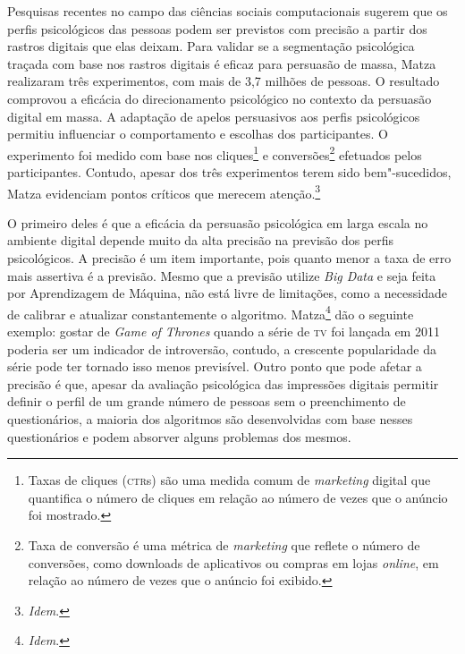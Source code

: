 Pesquisas recentes no campo das ciências sociais computacionais sugerem
que os perfis psicológicos das pessoas podem ser previstos com precisão
a partir dos rastros digitais que elas deixam. Para validar se a
segmentação psicológica traçada com base nos rastros digitais é eficaz
para persuasão de massa, Matza realizaram três
experimentos, com mais de 3,7 milhões de pessoas. O resultado comprovou
a eficácia do direcionamento psicológico no contexto da persuasão
digital em massa. A adaptação de apelos persuasivos aos perfis
psicológicos permitiu influenciar o comportamento e escolhas dos
participantes. O experimento foi medido com base nos cliques\footnote{Taxas
  de cliques (\textsc{ctr}s) são uma medida comum de \textit{marketing} digital que
  quantifica o número de cliques em relação ao número de vezes que o
  anúncio foi mostrado.} e conversões\footnote{Taxa de conversão é uma
  métrica de \textit{marketing} que reflete o número de conversões, como
  downloads de aplicativos ou compras em lojas \textit{online}, em relação ao
  número de vezes que o anúncio foi exibido.} efetuados pelos
participantes. Contudo, apesar dos três experimentos terem sido
bem"-sucedidos, Matza evidenciam pontos críticos que merecem
atenção.\footnote{\textit{Idem}.}

O primeiro deles é que a eficácia da persuasão psicológica em larga
escala no ambiente digital depende muito da alta precisão na previsão
dos perfis psicológicos. A precisão é um item importante, pois quanto
menor a taxa de erro mais assertiva é a previsão. Mesmo que a previsão
utilize \textit{Big Data} e seja feita por Aprendizagem de Máquina, não
está livre de limitações, como a necessidade de calibrar e atualizar
constantemente o algoritmo. Matza\footnote{\textit{Idem}.} dão o seguinte exemplo:
gostar de \textit{Game of Thrones} quando a série de \textsc{tv} foi lançada em
2011 poderia ser um indicador de introversão, contudo, a crescente
popularidade da série pode ter tornado isso menos previsível. Outro
ponto que pode afetar a precisão é que, apesar da avaliação psicológica
das impressões digitais permitir definir o perfil de um grande número de
pessoas sem o preenchimento de questionários, a maioria dos algoritmos
são desenvolvidas com base nesses questionários e podem absorver alguns
problemas dos mesmos.

